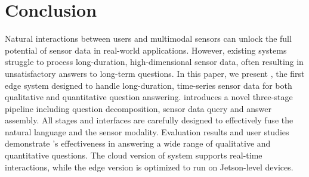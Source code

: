 \section{Conclusion}
\label{sec:conclusion}

Natural interactions between users and multimodal sensors can unlock the full potential of sensor data in real-world applications. However, existing systems struggle to process long-duration, high-dimensional sensor data, often resulting in unsatisfactory answers to long-term questions.
In this paper, we present \Method, the first edge system designed to handle long-duration, time-series sensor data for both qualitative and quantitative question answering. \Method introduces a novel three-stage pipeline including question decomposition, sensor data query and answer assembly.
All stages and interfaces are carefully designed to effectively fuse the natural language and the sensor modality.
Evaluation results and user studies demonstrate \Method's effectiveness in answering a wide range of qualitative and quantitative questions. The cloud version of \Method system supports real-time interactions, while the edge version is optimized to run on Jetson-level devices.
